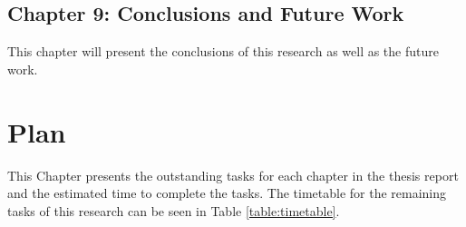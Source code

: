 \documentclass[12pt, a4paper]{report} \usepackage[titletoc]{appendix}
\begin{document}
\section{Chapter 9: Conclusions and Future Work}
\label{sec:chapter_9_conclusions}
This chapter will present the conclusions of this research as well as the future work. 


\chapter{Plan}
\label{ch:plan}
This Chapter presents the outstanding tasks for each chapter in the thesis report and the estimated time to complete the tasks. The timetable for the remaining tasks of this research can be seen in Table \ref{table:timetable}.
\end{document}
